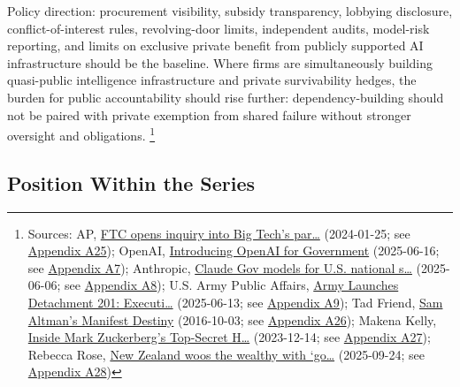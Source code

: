 \documentclass[
  american,
  11pt,
  letterpaper,
]{article}
\begin{document}
Policy direction: procurement visibility, subsidy transparency, lobbying
disclosure, conflict-of-interest rules, revolving-door limits,
independent audits, model-risk reporting, and limits on exclusive
private benefit from publicly supported AI infrastructure should be the
baseline. Where firms are simultaneously building quasi-public
intelligence infrastructure and private survivability hedges, the burden
for public accountability should rise further: dependency-building
should not be paired with private exemption from shared failure without
stronger oversight and obligations. \footnote{Sources: AP,
  \href{https://apnews.com/article/67feef411ef311f0be543f546ef34b3d}{FTC
  opens inquiry into Big Tech's par\ldots{}} (2024-01-25; see
  \hyperref[ch-10-appendix-a25-ftc-opens-inquiry-into-big-tech-s-partnerships-with-leading-ai-startups]{Appendix
  A25}); OpenAI,
  \href{https://openai.com/global-affairs/introducing-openai-for-government/}{Introducing
  OpenAI for Government} (2025-06-16; see
  \hyperref[ch-10-appendix-a7-introducing-openai-for-government]{Appendix
  A7}); Anthropic,
  \href{https://www.anthropic.com/news/claude-gov-models-for-u-s-national-security-customers}{Claude
  Gov models for U.S. national s\ldots{}} (2025-06-06; see
  \hyperref[ch-10-appendix-a8-claude-gov-models-for-u-s-national-security-customers]{Appendix
  A8}); U.S. Army Public Affairs,
  \href{https://www.army.mil/article/286317/army_launches_detachment_201_executive_innovation_corps_to_drive_tech_transformation}{Army
  Launches Detachment 201: Executi\ldots{}} (2025-06-13; see
  \hyperref[ch-10-appendix-a9-army-launches-detachment-201-executive-innovation-corps-to-drive-tech-transformation]{Appendix
  A9}); Tad Friend,
  \href{https://www.newyorker.com/magazine/2016/10/10/sam-altmans-manifest-destiny}{Sam
  Altman's Manifest Destiny} (2016-10-03; see
  \hyperref[ch-10-appendix-a26-sam-altman-s-manifest-destiny]{Appendix
  A26}); Makena Kelly,
  \href{https://www.wired.com/story/mark-zuckerberg-inside-hawaii-compound}{Inside
  Mark Zuckerberg's Top-Secret H\ldots{}} (2023-12-14; see
  \hyperref[ch-10-appendix-a27-inside-mark-zuckerbergs-top-secret-hawaii-compound]{Appendix
  A27}); Rebecca Rose,
  \href{https://www.ft.com/content/76ca455c-3b16-4413-8738-3f17431d125b}{New
  Zealand woos the wealthy with `go\ldots{}} (2025-09-24; see
  \hyperref[ch-10-appendix-a28-new-zealand-woos-the-wealthy-with-golden-visa-changes]{Appendix
  A28})}

\subsection{Position Within the
Series}\label{position-within-the-series-10}
\end{document}

